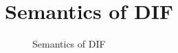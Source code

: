 \section{Semantics of DIF}

\begin{figure}[h]
    
    \caption{Semantics of DIF}
    \label{semantics}
\end{figure}
